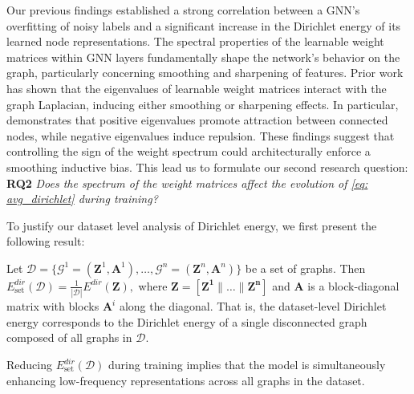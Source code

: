 


Our previous findings established a strong correlation between a GNN's overfitting of noisy labels and a significant increase in the Dirichlet energy of its learned node representations. 
The spectral properties of the learnable weight matrices within GNN layers fundamentally shape the network's behavior on the graph, particularly concerning smoothing and sharpening of features. Prior work~\cite{noteonoversmoothing, oversmoothing2, GRAFF} has shown that the eigenvalues of learnable weight matrices interact with the graph Laplacian, inducing either smoothing or sharpening effects. In particular, \cite{GRAFF} demonstrates that positive eigenvalues promote attraction between connected nodes, while negative eigenvalues induce repulsion.
These findings suggest that controlling the sign of the weight spectrum could architecturally enforce a smoothing inductive bias. 
This lead us to formulate our second research question: \textbf{RQ2} \textit{Does the spectrum of the weight matrices affect the evolution of \eqref{eq: avg_dirichlet} during training?}



To justify our dataset level analysis of Dirichlet energy, we first present the following result:

\begin{proposition}
\label{theorem: avg_dirichlet}
Let $\mathcal{D} = \{ \mathcal{G}^1= (\mathbf{Z}^1, \mathbf{A}^1), \ldots, \mathcal{G}^{n} = (\mathbf{Z}^n, \mathbf{A}^n) \}$ be a set of graphs. Then
\(
E^{dir}_\text{set}(\mathcal{D}) = \frac{1}{|\mathcal{D}|} E^{dir}(\mathbf{Z}),
\)
where $\mathbf{Z} = [\mathbf{Z^1} \| \ldots \| \mathbf{Z^n}]$ and $\mathbf{A}$ is a block-diagonal matrix with blocks $\mathbf{A}^i$ along the diagonal. That is, the dataset-level Dirichlet energy corresponds to the Dirichlet energy of a single disconnected graph composed of all graphs in $\mathcal{D}$.
\end{proposition} 
\begin{remark}
\label{cor: avg_energy}
Reducing $E^{dir}_\text{set}(\mathcal{D})$ during training implies that the model is simultaneously enhancing low-frequency representations across all graphs in the dataset.
\end{remark}

